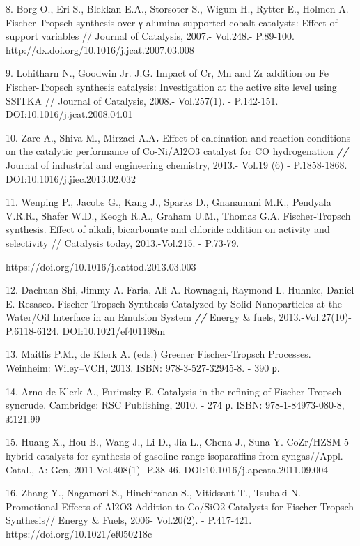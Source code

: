 8. Borg O., Eri S., Blekkan E.A., Storsoter S., Wigum H., Rytter E.,
Holmen A. Fischer-Tropsch synthesis over γ-alumina-supported cobalt
catalysts: Effect of support variables // Journal of Catalysis, 2007.-
Vol.248.- P.89-100. http://dx.doi.org/10.1016/j.jcat.2007.03.008

9. Lohitharn N., Goodwin Jr. J.G. Impact of Cr, Mn and Zr addition on Fe
Fischer-Tropsch synthesis catalysis: Investigation at the active site
level using SSITKA // Journal of Catalysis, 2008.- Vol.257(1). -
P.142-151. DOI:10.1016/j.jcat.2008.04.01

10. Zare A., Shiva M., Mirzaei A.A\emph{\textbf{.}} Effect of
calcination and reaction conditions on the catalytic performance of
Co-Ni/Al2O3 catalyst for CO hydrogenation \emph{\textbf{//}} Journal of
industrial and engineering chemistry, 2013.- Vol.19 (6) - P.1858-1868.
DOI:10.1016/j.jiec.2013.02.032

11. Wenping P., Jacobs G., Kang J., Sparks D., Gnanamani M.K., Pendyala
V.R.R., Shafer W.D., Keogh R.A., Graham U.M., Thomas G.A.
Fischer-Tropsch synthesis. Effect of alkali, bicarbonate and chloride
addition on activity and selectivity // Catalysis today, 2013.-Vol.215.
- P.73-79.

https://doi.org/10.1016/j.cattod.2013.03.003

12. Dachuan Shi, Jimmy A. Faria, Ali A. Rownaghi, Raymond L. Huhnke,
Daniel E. Resasco\emph{.} Fischer-Tropsch Synthesis Catalyzed by Solid
Nanoparticles at the Water/Oil Interface in an Emulsion System
\emph{\textbf{//}} Energy \& fuels, 2013.-Vol.27(10)- P.6118-6124.
DOI:10.1021/ef401198m

13. Maitlis P.M., de Klerk A. (eds.) Greener Fischer-Tropsch Processes.
Weinheim: Wiley--VCH, 2013. ISBN: 978-3-527-32945-8. - 390 р.

14. Arno de Klerk A., Furimsky E. Catalysis in the refining of
Fischer-Tropsch syncrude. Cambridge: RSC Publishing, 2010. - 274 р.
ISBN: 978-1-84973-080-8, £121.99

15. Huang X., Hou B., Wang J., Li D., Jia L., Chena J., Suna Y.
CoZr/HZSM-5 hybrid catalysts for synthesis of gasoline-range
isoparaffins from syngas//Appl. Catal., A: Gen, 2011.Vol.408(1)-
P.38-46. DOI:10.1016/j.apcata.2011.09.004

16. Zhang Y., Nagamori S., Hinchiranan S., Vitidsant T., Tsubaki N.
Promotional Effects of Al2O3 Addition to Co/SiO2 Catalysts for
Fischer-Tropsch Synthesis// Energy \& Fuels, 2006- Vol.20(2). -
P.417-421. https://doi.org/10.1021/ef050218c

